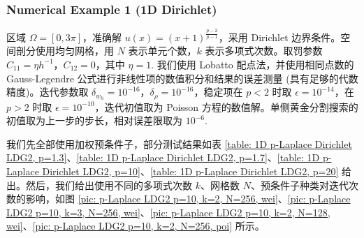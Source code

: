 \subsubsection{Numerical Example 1 (1D Dirichlet)}

区域 \(\Omega = [0,3\pi]\)，准确解 \(u(x) = (x+1)^{\frac{p-2}{p-1}}\)，采用 Dirichlet 边界条件。空间剖分使用均匀网格，用 \(N\) 表示单元个数，\(k\) 表示多项式次数。取罚参数 \(C_{11} = \eta h^{-1}\)，\(C_{12} = 0\)，其中 \(\eta = 1\). 我们使用 Lobatto 配点法，并使用相同点数的 Gauss-Legendre 公式进行非线性项的数值积分和结果的误差测量 (具有足够的代数精度)。迭代参数取 \(\delta_{w_{h}} = 10^{-16}\)，\(\delta_{\rho} = 10^{-16}\)，稳定项在 \(p < 2\) 时取 \(\epsilon = 10^{-14}\)，在 \(p > 2\) 时取 \(\epsilon = 10^{-10}\)，迭代初值取为 Poisson 方程的数值解。单侧黄金分割搜索的初值取为上一步的步长，相对误差限取为 \(10^{-6}\). 

我们先全部使用加权预条件子，部分测试结果如表 \ref{table: 1D p-Laplace Dirichlet LDG2, p=1.3}、\ref{table: 1D p-Laplace Dirichlet LDG2, p=1.7}、\ref{table: 1D p-Laplace Dirichlet LDG2, p=10}、\ref{table: 1D p-Laplace Dirichlet LDG2, p=20} 给出。然后，我们给出使用不同的多项式次数 \(k\)、网格数 \(N\)、预条件子种类对迭代次数的影响，如图 \ref{pic: p-Laplace LDG2 p=10, k=2, N=256, wei}、\ref{pic: p-Laplace LDG2 p=10, k=3, N=256, wei}、\ref{pic: p-Laplace LDG2 p=10, k=2, N=128, wei}、\ref{pic: p-Laplace LDG2 p=10, k=2, N=256, poi} 所示。


